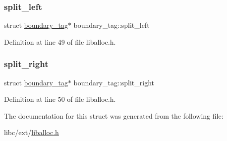 \subsubsection{\texorpdfstring{split\+\_\+left}{split\_left}}
{\footnotesize\ttfamily struct \hyperlink{a00126}{boundary\+\_\+tag}$\ast$ boundary\+\_\+tag\+::split\+\_\+left}



Definition at line 49 of file liballoc.\+h.

\mbox{\label{a00126_a9d43c9c4ff5ae35908dcfed0aec1907a_a9d43c9c4ff5ae35908dcfed0aec1907a}} 
\subsubsection{\texorpdfstring{split\+\_\+right}{split\_right}}
{\footnotesize\ttfamily struct \hyperlink{a00126}{boundary\+\_\+tag}$\ast$ boundary\+\_\+tag\+::split\+\_\+right}



Definition at line 50 of file liballoc.\+h.



The documentation for this struct was generated from the following file\+:\begin{DoxyCompactItemize}
\item 
libc/ext/\hyperlink{a00038}{liballoc.\+h}\end{DoxyCompactItemize}
